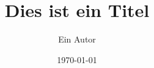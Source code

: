 





\providecommand\CONFonetwostyle{twoside}
\providecommand\CONFdraftfinal{final}











\title{Dies ist ein Titel}
\author{Ein Autor}
\date{\today}











\tableofcontents
\thispagestyle{empty}



\setcounter{page}{1}

